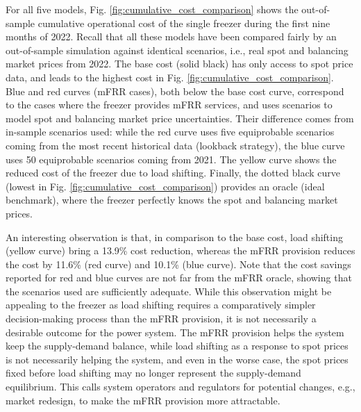 For all five models, Fig. \ref{fig:cumulative_cost_comparison} shows the out-of-sample cumulative operational cost of the single freezer during the first nine months of 2022. Recall that all these models have been compared fairly by an out-of-sample simulation against identical scenarios, i.e., real spot and balancing market prices from 2022.
The base cost (solid black) has only access to spot price data, and leads to the highest cost in Fig. \ref{fig:cumulative_cost_comparison}.
Blue and red curves (mFRR cases), both below the base cost curve, correspond to the cases where the freezer provides mFRR services, and uses scenarios to model spot and balancing market price uncertainties. Their difference comes from in-sample scenarios used: while the red curve uses five equiprobable scenarios coming from the most recent historical data (lookback strategy), the blue curve uses 50 equiprobable scenarios coming from 2021. The yellow curve shows the reduced cost of the freezer due to  load shifting. Finally, the dotted black curve (lowest in Fig. \ref{fig:cumulative_cost_comparison}) provides an oracle (ideal benchmark), where the freezer perfectly knows the spot and balancing market prices.

An interesting observation is that, in comparison to the base cost, load shifting (yellow curve) bring a 13.9\% cost reduction, whereas the mFRR  provision  reduces the cost by  11.6\% (red curve) and 10.1\% (blue curve). Note that the cost savings reported for red and blue curves are not far  from the mFRR oracle, showing that the scenarios used are sufficiently adequate.
While this observation might be appealing to the freezer as load shifting requires a comparatively simpler decision-making process than the mFRR provision, it is not necessarily a desirable outcome for the power system. The mFRR  provision helps the system keep the supply-demand balance, while load shifting as a response to spot prices is not necessarily helping the system, and even in the worse case, the spot prices fixed before load shifting may no longer represent the supply-demand equilibrium. This calls system operators and regulators for potential changes, e.g., market redesign, to make the mFRR  provision more attractable.



